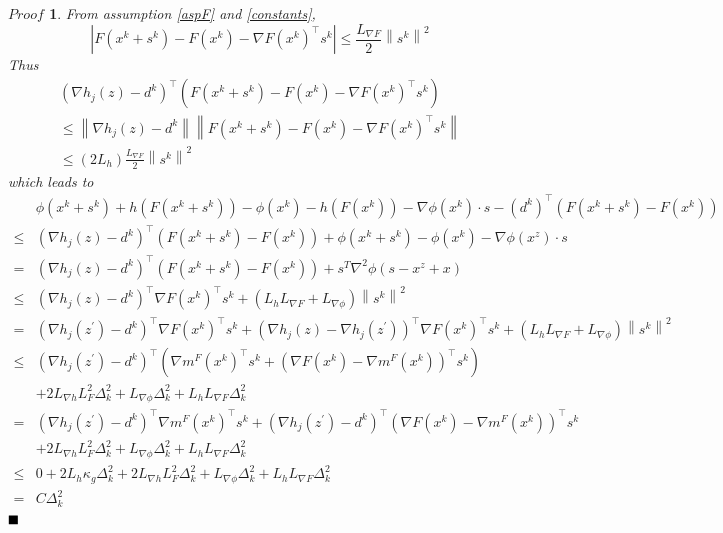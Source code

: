\documentclass[10pt, oneside]{article}
\newtheorem*{Proof}{$Proof$}
\begin{document}
\begin{Proof}
From assumption \ref{aspF} and \ref{constants}, 
$$
\left|F(x^{k}+s^{k})-F(x^{k})-\nabla F(x^{k})^{\top} s^{k}\right| \leq \frac{L_{\nabla F}}{2}\left\|s^{k}\right\|^{2}
$$
Thus
$$
\begin{array}{l}
\left(\nabla h_{j}(z)-d^{k}\right)^{\top}\left(F(x^{k}+s^{k})-F(x^{k})-\nabla F(x^{k})^{\top} s^{k}\right) \\
\leq\left\|\nabla h_{j}(z)-d^{k}\right\|\left\|F(x^{k}+s^{k})-F(x^{k})-\nabla F(x^{k})^{\top} s^{k}\right\| \\
\leq\left(2 L_{h}\right) \frac{L_{\nabla F}}{2}\left\|s^{k}\right\|^{2}
\end{array}
$$
which leads to 
$$
\begin{aligned}
& \phi(x^k+s^k)+h(F(x^{k}+s^{k}))-\phi(x^k)-h(F(x^{k}))-\nabla\phi(x^k)\cdot s-\left(d^{k}\right)^{\top}\left(F(x^{k}+s^{k})-F(x^{k})\right) \\
\leq &\left(\nabla h_{j}(z)-d^{k}\right)^{\top}\left(F(x^{k}+s^{k})-F(x^{k})\right) +\phi(x^k+s^k)-\phi(x^k)-\nabla\phi(x^z)\cdot s\\
= &\left(\nabla h_{j}(z)-d^{k}\right)^{\top}\left(F(x^{k}+s^{k})-F(x^{k})\right) +s^T\nabla^2\phi (s-x^z+x)\\
\leq &\left(\nabla h_{j}(z)-d^{k}\right)^{\top} \nabla F(x^{k})^{\top} s^{k}+\left(L_{h} L_{\nabla F}+L_{\nabla \phi}\right)\left\|s^{k}\right\|^{2} \\
=&\left(\nabla h_{j}\left(z^{\prime}\right)-d^{k}\right)^{\top} \nabla F(x^{k})^{\top} s^{k}+\left(\nabla h_{j}(z)-\nabla h_{j}\left(z^{\prime}\right)\right)^{\top} \nabla F(x^{k})^{\top} s^{k}+\left(L_{h} L_{\nabla F}+L_{\nabla \phi}\right)\left\|s^{k}\right\|^{2} \\
\leq &\left(\nabla h_{j}\left(z^{\prime}\right)-d^{k}\right)^{\top}\left(\nabla m^F(x^{k})^{\top} s^{k}+\left(\nabla F(x^{k})-\nabla m^F(x^{k})\right)^{\top} s^{k}\right) \\
&+2 L_{\nabla h} L_{F}^{2} \Delta_{k}^{2}+L_{\nabla\phi}\Delta_k^2+L_{h} L_{\nabla F} \Delta_{k}^{2} \\
=&\left(\nabla h_{j}\left(z^{\prime}\right)-d^{k}\right)^{\top} \nabla m^F(x^{k})^{\top} s^{k}+\left(\nabla h_{j}\left(z^{\prime}\right)-d^{k}\right)^{\top}\left(\nabla F(x^{k})-\nabla m^F(x^{k})\right)^{\top} s^{k} \\
&+2 L_{\nabla h} L_{F}^{2} \Delta_{k}^{2}+L_{\nabla\phi}\Delta_k^2+L_{h} L_{\nabla F} \Delta_{k}^{2} \\
\leq & 0+2 L_{h} \kappa_{g} \Delta_{k}^{2}+2 L_{\nabla h} L_{F}^{2} \Delta_{k}^{2}+L_{\nabla\phi}\Delta_k^2+L_{h} L_{\nabla F} \Delta_{k}^{2} \\
=& C \Delta_{k}^{2}
\end{aligned}
$$
$\hfill\blacksquare$
\end{Proof}
\end{document}
